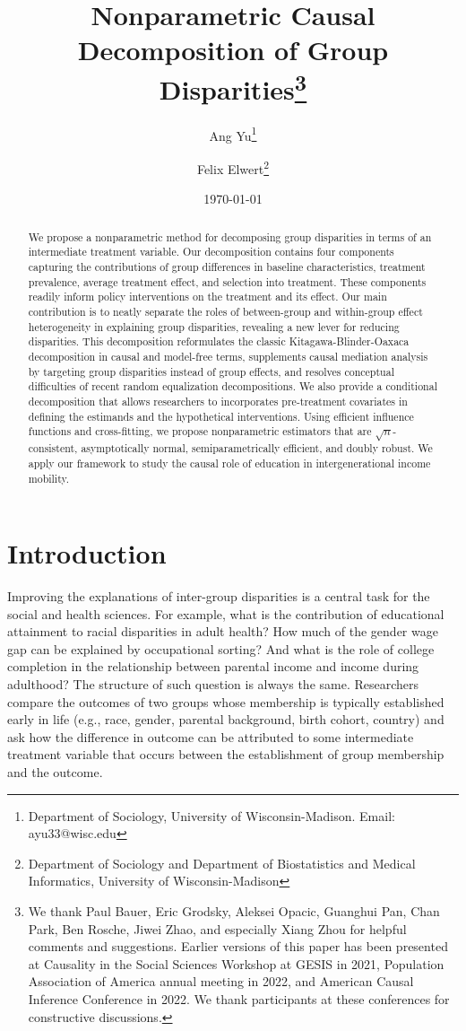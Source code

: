 \documentclass[12pt,a4paper]{article}
\title{\Large Nonparametric Causal Decomposition of Group Disparities\thanks{We thank Paul Bauer, Eric Grodsky, Aleksei Opacic, Guanghui Pan, Chan Park, Ben Rosche, Jiwei Zhao, and especially Xiang Zhou for helpful comments and suggestions. Earlier versions of this paper has been presented at Causality in the Social Sciences Workshop at GESIS in 2021, Population Association of America annual meeting in 2022, and American Causal Inference Conference in 2022. We thank participants at these conferences for constructive discussions.}}
\author{\large Ang Yu\thanks{Department of Sociology, University of Wisconsin-Madison. Email: ayu33@wisc.edu} \and Felix Elwert\thanks{Department of Sociology and Department of Biostatistics and Medical Informatics, University of Wisconsin-Madison}}
\date{\large \today}
\begin{document}
\maketitle

\begin{abstract}
We propose a nonparametric method for decomposing group disparities in terms of an intermediate treatment variable. Our decomposition contains four components capturing the contributions of group differences in baseline characteristics, treatment prevalence, average treatment effect, and selection into treatment. These components readily inform policy interventions on the treatment and its effect. Our main contribution is to neatly separate the roles of between-group and within-group effect heterogeneity in explaining group disparities, revealing a new lever for reducing disparities. This decomposition reformulates the classic Kitagawa-Blinder-Oaxaca decomposition in causal and model-free terms, supplements causal mediation analysis by targeting group disparities instead of group effects, and resolves conceptual difficulties of recent random equalization decompositions. We also provide a conditional decomposition that allows researchers to incorporates pre-treatment covariates in defining the estimands and the hypothetical interventions. Using efficient influence functions and cross-fitting, we propose nonparametric estimators that are $\sqrt{n}$-consistent, asymptotically normal, semiparametrically efficient, and doubly robust. We apply our framework to study the causal role of education in intergenerational income mobility. 
\end{abstract}

\section{Introduction}

Improving the explanations of inter-group disparities is a central task for the social and health sciences. For example, what is the contribution of educational attainment to racial disparities in adult health? How much of the gender wage gap can be explained by occupational sorting? And what is the role of college completion in the relationship between parental income and income during adulthood? 
The structure of such question is always the same. Researchers compare the outcomes of two groups whose membership is typically established early in life (e.g., race, gender, parental background, birth cohort, country) and ask how the difference in outcome can be attributed to some intermediate treatment variable that occurs between the establishment of group membership and the outcome. 
\end{document}
